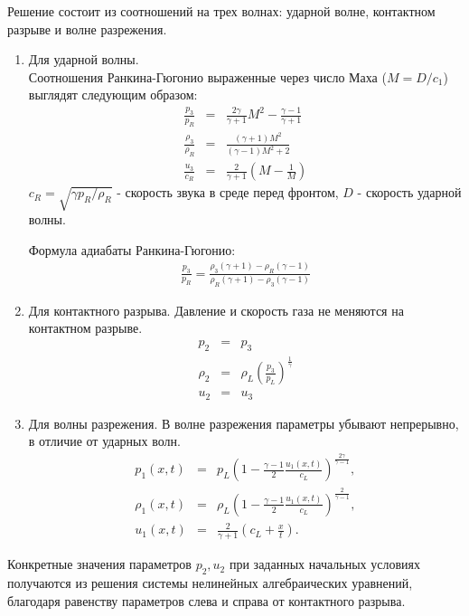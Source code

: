 \documentclass[a4paper,12pt]{extarticle}
\begin{document}
Решение состоит из соотношений на трех волнах: ударной волне, контактном разрыве и волне разрежения. 
\begin{enumerate}
    \item Для ударной волны. \\
    Соотношения Ранкина-Гюгонио выраженные через число Маха ($M= D/c_1$) выглядят следующим образом:
    \begin{eqnarray}
        \frac{p_3}{p_R} & = & \frac{2\gamma}{\gamma+1}M^2-\frac{\gamma-1}{\gamma+1} \\
        \frac{\rho_3}{\rho_R} & = & \frac{(\gamma+1)M^2}{(\gamma-1)M^2+2} \\
        \frac{u_3}{c_R} & = & \frac{2}{\gamma+1}(M-\frac{1}{M})
    \end{eqnarray} 
    $c_R = \sqrt{\gamma p_R / \rho_R}$  - скорость звука в среде перед фронтом, $D$ - скорость ударной волны.
    
    Формула адиабаты Ранкина-Гюгонио:
    \begin{align}
        \frac{p_3}{p_R}=\frac{\rho_3(\gamma+1)-\rho_R(\gamma-1)}{\rho_R(\gamma+1)-\rho_3(\gamma-1)}
    \end{align}

    \item Для контактного разрыва.
    Давление и скорость газа не меняются на контактном разрыве. 
    \begin{eqnarray}
        p_2&=&p_3\\
        \rho_2&=&\rho_L \left( \frac{p_3}{p_L} \right)^\frac{1}{\gamma}\\
        u_2&= &u_3
    \end{eqnarray} 
    \item Для волны разрежения.
    В волне разрежения параметры убывают непрерывно, в отличие от ударных волн.
    \begin{eqnarray}
        p_1(x,t)&=&p_L \left( 1-\frac{\gamma-1}{2}\frac{u_1(x,t)}{c_L} \right)^\frac{2\gamma}{\gamma-1},\\
        \rho_1(x,t)&=&\rho_L \left( 1-\frac{\gamma-1}{2}\frac{u_1(x,t)}{c_L} \right)^\frac{2}{\gamma-1},\\
        u_1(x,t) &=& \frac{2}{\gamma+1}(c_L + \frac{x}{t}).
    \end{eqnarray} 
\end{enumerate}
    Конкретные значения параметров $p_2,u_2$ при заданных начальных условиях получаются из решения системы нелинейных алгебраических уравнений, благодаря равенству параметров слева и справа от контактного разрыва.
\end{document}
